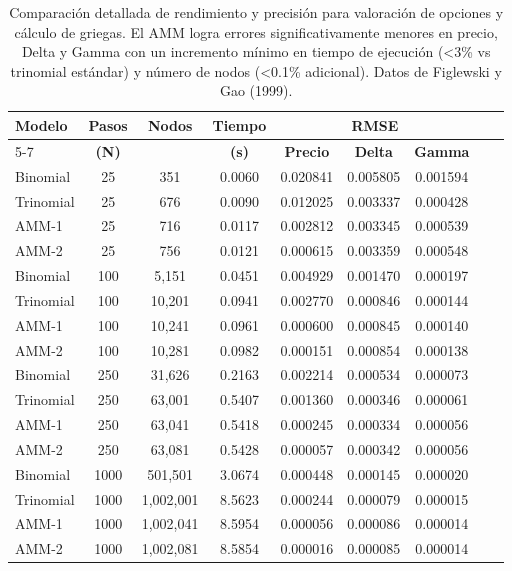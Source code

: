 \begin{table}[H]
\centering
\small
\begin{tabular}{lcccccccc}
\toprule
\textbf{Modelo} & \textbf{Pasos} & \textbf{Nodos} & \textbf{Tiempo} & \multicolumn{3}{c}{\textbf{RMSE}} \\
\cmidrule(lr){5-7}
 & \textbf{(N)} &  & \textbf{(s)} & \textbf{Precio} & \textbf{Delta} & \textbf{Gamma} \\
\midrule
Binomial & 25 & 351 & 0.0060 & 0.020841 & 0.005805 & 0.001594 \\
Trinomial & 25 & 676 & 0.0090 & 0.012025 & 0.003337 & 0.000428 \\
AMM-1 & 25 & 716 & 0.0117 & 0.002812 & 0.003345 & 0.000539 \\
AMM-2 & 25 & 756 & 0.0121 & 0.000615 & 0.003359 & 0.000548 \\
\midrule
Binomial & 100 & 5,151 & 0.0451 & 0.004929 & 0.001470 & 0.000197 \\
Trinomial & 100 & 10,201 & 0.0941 & 0.002770 & 0.000846 & 0.000144 \\
AMM-1 & 100 & 10,241 & 0.0961 & 0.000600 & 0.000845 & 0.000140 \\
AMM-2 & 100 & 10,281 & 0.0982 & 0.000151 & 0.000854 & 0.000138 \\
\midrule
Binomial & 250 & 31,626 & 0.2163 & 0.002214 & 0.000534 & 0.000073 \\
Trinomial & 250 & 63,001 & 0.5407 & 0.001360 & 0.000346 & 0.000061 \\
AMM-1 & 250 & 63,041 & 0.5418 & 0.000245 & 0.000334 & 0.000056 \\
AMM-2 & 250 & 63,081 & 0.5428 & 0.000057 & 0.000342 & 0.000056 \\
\midrule
Binomial & 1000 & 501,501 & 3.0674 & 0.000448 & 0.000145 & 0.000020 \\
Trinomial & 1000 & 1,002,001 & 8.5623 & 0.000244 & 0.000079 & 0.000015 \\
AMM-1 & 1000 & 1,002,041 & 8.5954 & 0.000056 & 0.000086 & 0.000014 \\
AMM-2 & 1000 & 1,002,081 & 8.5854 & 0.000016 & 0.000085 & 0.000014 \\
\bottomrule
\end{tabular}
\caption{Comparación detallada de rendimiento y precisión para valoración de opciones y cálculo de griegas. El AMM logra errores significativamente menores en precio, Delta y Gamma con un incremento mínimo en tiempo de ejecución (<3\% vs trinomial estándar) y número de nodos (<0.1\% adicional). Datos de Figlewski y Gao (1999).}
\label{tab:amm_performance_detailed}
\end{table}

